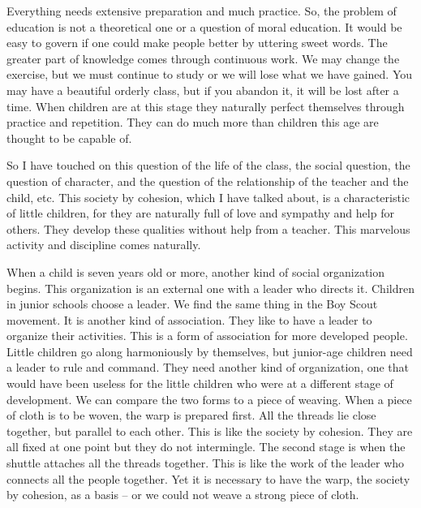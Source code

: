 \documentclass[lang=cn,10pt]{elegantbook}
\begin{document}
Everything needs extensive preparation and much practice. So, the problem of education is not a theoretical one or a question of moral education. It would be easy to govern if one could make people better by uttering sweet words. The greater part of knowledge comes through continuous work. We may change the exercise, but we must continue to study or we will lose what we have gained. You may have a beautiful orderly class, but if you abandon it, it will be lost after a time. When children are at this stage they naturally perfect themselves through practice and repetition. They can do much more than children this age are thought to be capable of.

So I have touched on this question of the life of the class, the social question, the question of character, and the question of the relationship of the teacher and the child, etc. This society by cohesion, which I have talked about, is a characteristic of little children, for they are naturally full of love and sympathy and help for others. They develop these qualities without help from a teacher. This marvelous activity and discipline comes naturally.

When a child is seven years old or more, another kind of social organization begins. This organization is an external one with a leader who directs it. Children in junior schools choose a leader. We find the same thing in the Boy Scout movement. It is another kind of association. They like to have a leader to organize their activities. This is a form of association for more developed people. Little children go along harmoniously by themselves, but junior-age children need a leader to rule and command. They need another kind of organization, one that would have been useless for the little children who were at a different stage of development. We can compare the two forms to a piece of weaving. When a piece of cloth is to be woven, the warp is prepared first. All the threads lie close together, but parallel to each other. This is like the society by cohesion. They are all fixed at one point but they do not intermingle. The second stage is when the shuttle attaches all the threads together. This is like the work of the leader who connects all the people together. Yet it is necessary to have the warp, the society by cohesion, as a basis – or we could not weave a strong piece of cloth.
\end{document}
